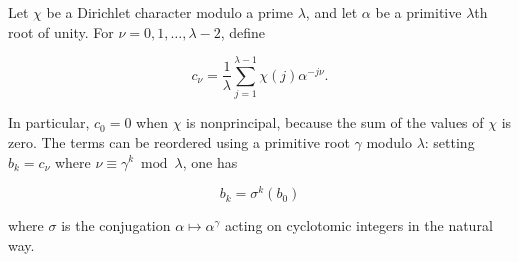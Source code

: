 Let $\chi$ be a Dirichlet character modulo a prime $\lambda$, and let $\alpha$ be a primitive $\lambda$th root of unity. For $\nu = 0, 1, \dots, \lambda-2$, define

$$c_\nu = \frac{1}{\lambda} \sum_{j=1}^{\lambda-1} \chi(j) \alpha^{-j\nu}.$$

In particular, $c_0 = 0$ when $\chi$ is nonprincipal, because the sum of the values of $\chi$ is zero. The terms can be reordered using a primitive root $\gamma$ modulo $\lambda$: setting $b_k = c_\nu$ where $\nu \equiv \gamma^k \bmod \lambda$, one has

$$b_k = \sigma^k(b_0)$$

where $\sigma$ is the conjugation $\alpha \mapsto \alpha^\gamma$ acting on cyclotomic integers in the natural way.

